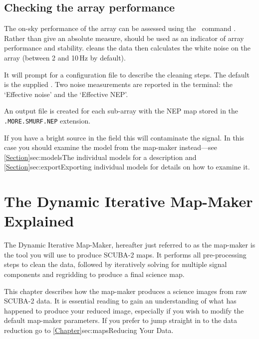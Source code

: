 \documentclass[11pt,oneside,chapters]{starlink}
\begin{document}
\section{Checking the array performance}
\label{sec:calcnoise}

The on-sky performance of the array can be assessed using the \smurf\
command \calcnoise. Rather than give an absolute measure,
 should be used as an indicator of array performance
and stability.  \task{calcnoise} cleans the data then calculates the
white noise on the array (between 2 and 10\,Hz by default).
\begin{terminalv}
\end{terminalv}
It will prompt for a configuration file to describe the cleaning
steps. The default is the supplied .
Two noise measurements are reported in the terminal: the `Effective
noise' and the `Effective NEP'.

An output file is created for each sub-array with the NEP map stored
in the \texttt{.MORE.SMURF.NEP} extension.

If you have a bright source in the field this will contaminate the
signal. In this case you should examine the \model{NOI} model from the
map-maker instead---see \cref{Section}{sec:models}{The individual
  models} for a description and \cref{Section}{sec:export}{Exporting
  individual models} for details on how to examine it.

\chapter{The Dynamic Iterative Map-Maker Explained}
\label{sec:dimm}

The Dynamic Iterative Map-Maker, hereafter just referred to as the
map-maker is the tool you will use to produce SCUBA-2 maps. It
performs all pre-processing steps to clean the data, followed by
iteratively solving for multiple signal components and regridding to
produce a final science map.

This chapter describes how the map-maker produces a science images
from raw SCUBA-2 data. It is essential reading to gain an
understanding of what has happened to produce your reduced image,
especially if you wish to modify the default map-maker parameters.
\color{red} If you prefer to jump straight in to the data reduction go
to \cref{Chapter}{sec:maps}{Reducing Your Data}.\color{black}
\end{document}
